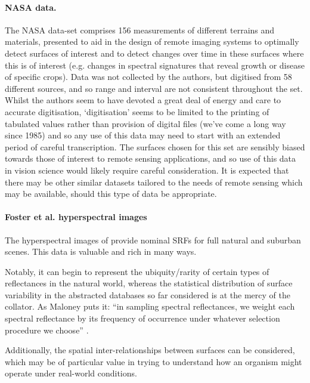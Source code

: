 \paragraph{NASA data.}
The NASA data-set \citep{david_e._bowker_spectral_1985} comprises 156 measurements of different terrains and materials, presented to aid in the design of remote imaging systems to optimally detect surfaces of interest and to detect changes over time in these surfaces where this is of interest (e.g. changes in spectral signatures that reveal growth or disease of specific crops). Data was not collected by the authors, but digitised from 58 different sources, and so range and interval are not consistent throughout the set. Whilst the authors seem to have devoted a great deal of energy and care to accurate digitisation, `digitisation' seems to be limited to the printing of tabulated values rather than provision of digital files (we've come a long way since 1985) and so any use of this data may need to start with an extended period of careful transcription. The surfaces chosen for this set are sensibly biased towards those of interest to remote sensing applications, and so use of this data in vision science would likely require careful consideration. It is expected that there may be other similar datasets tailored to the needs of remote sensing which may be available, should this type of data be appropriate.

\paragraph{Foster et al. hyperspectral images}
The hyperspectral images of \citet{nascimento_statistics_2002,foster_frequency_2006} provide nominal \glspl{SRF} for full natural and suburban scenes. This data is valuable and rich in many ways. 

Notably, it can begin to represent the ubiquity/rarity of certain types of reflectances in the natural world, whereas the statistical distribution of surface variability in the abstracted databases so far considered is at the mercy of the collator. As Maloney puts it: ``in sampling spectral reflectances, we weight each spectral reflectance by its frequency of occurrence under whatever selection procedure we choose'' \cite{maloney_computational_1984}.

Additionally, the spatial inter-relationships between surfaces can be considered, which may be of particular value in trying to understand how an organism might operate under real-world conditions.

